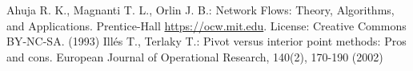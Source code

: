 \begin{thebibliography}{40}
  Ahuja R. K., Magnanti T. L., Orlin J. B.: Network Flows: Theory, Algorithms, and Applications. Prentice-Hall
  \url{https://ocw.mit.edu}. License: Creative Commons BY-NC-SA. (1993)
  Ill\'es T., Terlaky T.: Pivot versus interior point methods: Pros and cons. European Journal of Operational Research,
  140(2), 170-190 (2002)
\end{thebibliography}

